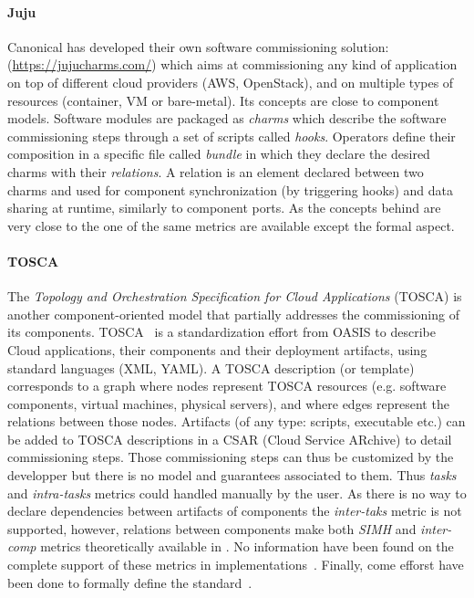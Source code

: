 \paragraph{Juju}
Canonical has developed their own software commissioning solution:
\juju (\url{https://jujucharms.com/}) which aims at commissioning any
kind of application on top of different cloud providers (\eg AWS,
OpenStack), and on multiple types of resources (container, VM or
bare-metal). Its concepts are close to component models. Software
modules are packaged as \juju \emph{charms} which describe the
software commissioning steps through a set of scripts called
\emph{hooks}. Operators define their composition in a specific file
called \emph{bundle} in which they declare the desired charms with
their \emph{relations}. A relation is an element declared between two
charms and used for component synchronization (by triggering hooks)
and data sharing at runtime, similarly to component ports. As the
concepts behind \juju are very close to the one of \aeolus the same
metrics are available except the formal aspect.

\paragraph{TOSCA}
The \emph{Topology and Orchestration Specification for Cloud
  Applications} (TOSCA) is another component-oriented model that
partially addresses the commissioning of its
components. TOSCA~\cite{tosca:web,10.1007/978-3-319-74781-1_33} is a
standardization effort from OASIS to describe Cloud applications,
their components and their deployment artifacts, using standard
languages (\ie XML, YAML). A TOSCA description (or template)
corresponds to a graph where nodes represent TOSCA resources
(e.g. software components, virtual machines, physical servers), and
where edges represent the relations between those nodes. Artifacts (of
any type: scripts, executable etc.) can be added to TOSCA descriptions
in a CSAR (Cloud Service ARchive) to detail commissioning steps. Those
commissioning steps can thus be customized by the developper but there
is no model and guarantees associated to them. Thus \emph{tasks} and
\emph{intra-tasks} metrics could handled manually by the user. As
there is no way to declare dependencies between artifacts of
components the \emph{inter-taks} metric is not supported, however,
relations between components make both \emph{SIMH} and
\emph{inter-comp} metrics theoretically available in \tosca. No
information have been found on the complete support of these metrics
in \tosca implementations~\cite{}. Finally, come efforst have been
done to formally define the \tosca standard~\cite{}.

